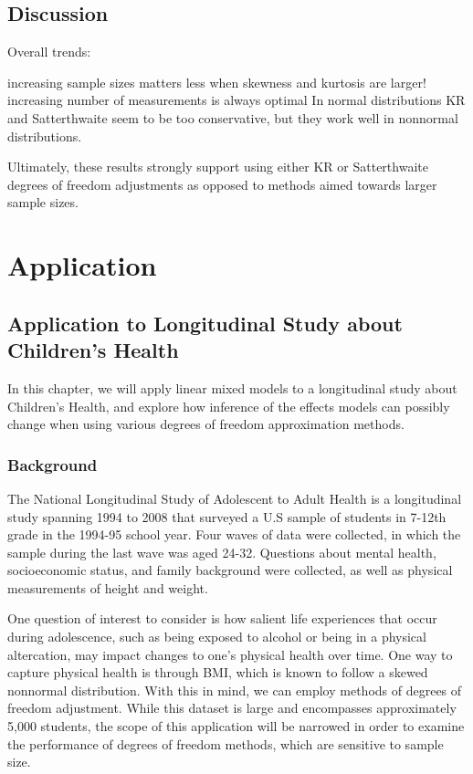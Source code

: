 \documentclass[12pt, twoside]{amherstthesis}
\begin{document}
\hypertarget{discussion}{%
\section{Discussion}\label{discussion}}

Overall trends:

increasing sample sizes matters less when skewness and kurtosis are larger!
increasing number of measurements is always optimal
In normal distributions KR and Satterthwaite seem to be too conservative, but they work well in nonnormal distributions.

Ultimately, these results strongly support using either KR or Satterthwaite degrees of freedom adjustments as opposed to methods aimed towards larger sample sizes.

\hypertarget{math-sci}{%
\chapter{Application}\label{math-sci}}

\hypertarget{application-to-longitudinal-study-about-childrens-health}{%
\section{Application to Longitudinal Study about Children's Health}\label{application-to-longitudinal-study-about-childrens-health}}

In this chapter, we will apply linear mixed models to a longitudinal study about Children's Health, and explore how inference of the effects models can possibly change when using various degrees of freedom approximation methods.

\hypertarget{background}{%
\subsection{Background}\label{background}}

The National Longitudinal Study of Adolescent to Adult Health is a longitudinal study spanning 1994 to 2008 that surveyed a U.S sample of students in 7-12th grade in the 1994-95 school year. Four waves of data were collected, in which the sample during the last wave was aged 24-32. Questions about mental health, socioeconomic status, and family background were collected, as well as physical measurements of height and weight.

One question of interest to consider is how salient life experiences that occur during adolescence, such as being exposed to alcohol or being in a physical altercation, may impact changes to one's physical health over time. One way to capture physical health is through BMI, which is known to follow a skewed nonnormal distribution. With this in mind, we can employ methods of degrees of freedom adjustment. While this dataset is large and encompasses approximately 5,000 students, the scope of this application will be narrowed in order to examine the performance of degrees of freedom methods, which are sensitive to sample size.
\end{document}
